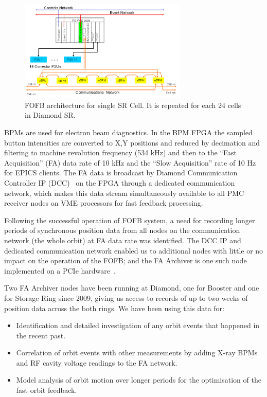 \documentclass[a4paper,
              ]{jacow}
\begin{document}
\begin{figure}[b!]
   \centering
   \includegraphics[width=80mm]{img/WEPGF089f1}
   \caption{FOFB architecture for single SR Cell. It is repeated for each 24 cells in Diamond SR.}
   \label{FOFB}
\end{figure}

BPMs are used for electron beam diagnostics. In the BPM FPGA the sampled button intensities are converted to X,Y positions and reduced by decimation and filtering to machine revolution frequency (534 kHz) and then to the “Fast Acquisition” (FA) data rate of 10 kHz and the “Slow Acquisition” rate of 10 Hz for EPICS clients. The FA data is broadcast by Diamond Communication Controller IP (DCC)~\cite{DCC} on the FPGA through a dedicated communication network, which makes this data stream simultaneously available to all PMC receiver nodes on VME processors for fast feedback processing. 

Following the successful operation of FOFB system, a need for recording longer periods of synchronous position data from all nodes on the communication network (the whole orbit) at FA data rate was identified. The DCC IP and dedicated communication network enabled us to additional nodes with little or no impact on the operation of the FOFB; and the FA Archiver is one such node implemented on a PCIe hardware~\cite{ARCHIVER}.

Two FA Archiver nodes have been running at Diamond, one for Booster and one for Storage Ring since 2009, giving us access to records of up to two weeks of position data across the both rings. We have been using this data for:

\begin{itemize}
\setlength\itemsep{0em}
\item Identification and detailed investigation of any orbit events that happened in the recent past.
\item Correlation of orbit events with other measurements by adding X-ray BPMs and RF cavity voltage readings to the FA network.
\item Model analysis of orbit motion over longer periods for the optimisation of the fast orbit feedback.
\end{itemize}
\end{document}

